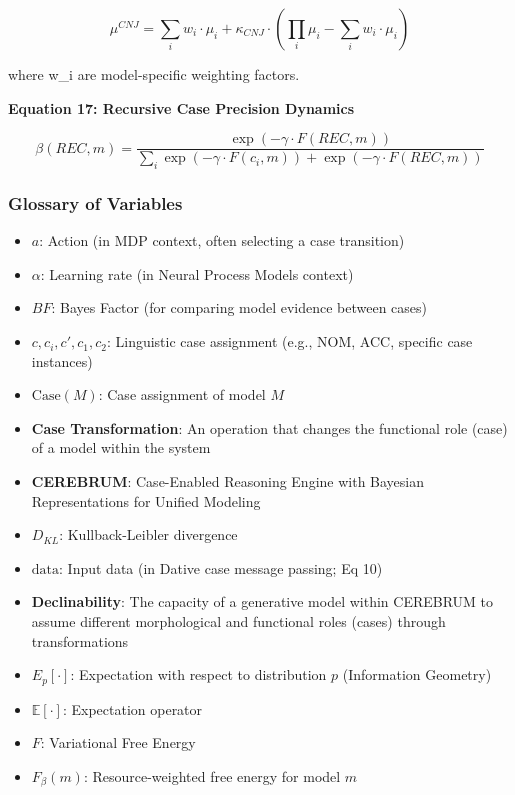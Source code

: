 \documentclass[
]{book}
\providecommand{\tightlist}{%
  \setlength{\itemsep}{0pt}\setlength{\parskip}{0pt}}
\begin{document}
\[\mu^{CNJ} = \sum_i w_i \cdot \mu_i + \kappa_{CNJ} \cdot (\prod_i \mu_i - \sum_i w_i \cdot \mu_i)  \tag{16}\]

where w\_i are model-specific weighting factors.

\textbf{Equation 17: Recursive Case Precision Dynamics}

\[\beta(REC,m) = \frac{\exp(-\gamma \cdot F(REC,m))}{\sum_i \exp(-\gamma \cdot F(c_i,m)) + \exp(-\gamma \cdot F(REC,m))}  \tag{17}\]

\hypertarget{glossary-of-variables}{%
\subsubsection{Glossary of Variables}\label{glossary-of-variables}}

\begin{itemize}
\tightlist
\item
  \(a\): Action (in MDP context, often selecting a case transition)
\item
  \(\alpha\): Learning rate (in Neural Process Models context)
\item
  \(BF\): Bayes Factor (for comparing model evidence between cases)
\item
  \(c, c_i, c', c_1, c_2\): Linguistic case assignment (e.g., NOM, ACC,
  specific case instances)
\item
  \(\text{Case}(M)\): Case assignment of model \(M\)
\item
  \textbf{Case Transformation}: An operation that changes the functional
  role (case) of a model within the system
\item
  \textbf{CEREBRUM}: Case-Enabled Reasoning Engine with Bayesian
  Representations for Unified Modeling
\item
  \(D_{KL}\): Kullback-Leibler divergence
\item
  \(\text{data}\): Input data (in Dative case message passing; Eq 10)
\item
  \textbf{Declinability}: The capacity of a generative model within
  CEREBRUM to assume different morphological and functional roles
  (cases) through transformations
\item
  \(E_p[\cdot]\): Expectation with respect to distribution \(p\)
  (Information Geometry)
\item
  \(\mathbb{E}[\cdot]\): Expectation operator
\item
  \(F\): Variational Free Energy
\item
  \(F_{\beta}(m)\): Resource-weighted free energy for model \(m\)

\end{itemize}
\end{document}
